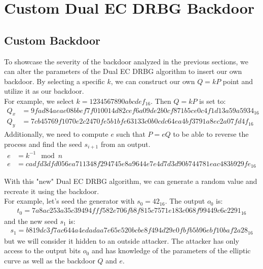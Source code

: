 \section{Custom Dual EC DRBG Backdoor}

\subsection{Custom Backdoor}

To showcase the severity of the backdoor analyzed in the previous sections, we can alter the parameters of the Dual EC DRBG algorithm to insert our own backdoor. By selecting a specific $k$, we can construct our own $Q = kP$ point and utilize it as our backdoor.
\\

For example, we select $k = 1234567890abcdef_{16}$. Then $Q = kP$ is set to:
\begin{align*}
    Q_x &= 9fad84aeae08bbef7f010014d82cef6a09de2b0cf871b5ce0c4f1d13a59a5934_{16}\\
    Q_y &= 7cb45769f1070e2c2470fe5b1bfe63133c0b0cdc64ea4bf3791a8ec2a07fd4f_{16}
\end{align*}
\noindent
Additionally, we need to compute $e$ such that $P = eQ$ to be able to reverse the process and find the seed $s_{i + 1}$ from an output.
\begin{align*}
    e &= k^{-1} \mod n\\
    e &= cadfd3dfd056ea711348f294745e8a9644e7e4d7d3d90b744781eac483b929fe_{16}
\end{align*}

\noindent
With this "new" Dual EC DRBG algorithm, we can generate a random value and recreate it using the backdoor.
\\

\noindent
For example, let's seed the generator with $s_0 = 42_{16}$. The output $o_0$ is:
\begin{align*}
    t_0 = 7a8ac253a35c39494fff582e706fb8f815c7571e183c068f99449c6c2291_{16}
\end{align*}
and the new seed $s_1$ is:
\begin{align*}
    s_1 = b819dc3f7ac644a4edadaa7e65e520bcbe8f494d29e0fbfb5b96ebf10baf2a28_{16}
\end{align*}
but we will consider it hidden to an outside attacker. The attacker has only access to the output bits $o_0$ and has knowledge of the parameters of the elliptic curve as well as the backdoor $Q$ and $e$.
\\

